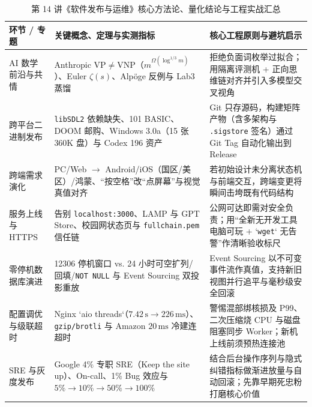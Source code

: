 \documentclass[a4paper]{article}
\begin{document}
\begin{table}[H]
\centering
\caption{第 14 讲《软件发布与运维》核心方法论、量化结论与工程实战汇总}
\label{tab:lecture14_summary}
\begin{tabular}{p{3.1cm}p{5.6cm}p{5.6cm}}
\toprule
\textbf{环节 / 专题} & \textbf{关键概念、定理与实测指标} & \textbf{核心工程原则与避坑启示} \\
\midrule
AI 数学前沿与共情 & Anthropic $\mathrm{VP} \neq \mathrm{VNP}$（$m^{\Omega(\log^{1/3} m)}$）、Euler $\zeta(s)$、Alpöge 反例与 Lab3 蒸馏 & 拒绝负面词枚举过拟合；用隔离评测机 + 正向思维链对齐并引入多模型交叉视角 \\
跨平台二进制发布 & \texttt{libSDL2} 依赖缺失、101 BASIC、DOOM 邮购、Windows 3.0a（15 张 360K 盘）与 Codex 196 资产 & Git 只存源码，构建矩阵产物（含多架构与 \texttt{.sigstore} 签名）通过 Git Tag 自动化输出到 Release \\
跨端需求演化 & PC/Web $\to$ Android/iOS（国区/美区）/鸿蒙、“按空格”改“点屏幕”与视觉真值对齐 & 若初始设计未分离状态机与前端交互，跨端变更将瞬间击垮既有代码结构 \\
服务上线与 HTTPS & 告别 \texttt{localhost:3000}、LAMP 与 GPT Store、校园网状态页与 \texttt{fullchain.pem} 信任链 & 公网可达即需对安全负责；用“全新无开发工具电脑可玩 + `\texttt{wget}` 无告警”作清晰验收标尺 \\
零停机数据库演进 & 12306 停机窗口 vs. 24 小时可空扩列/回填/\texttt{NOT NULL} 与 Event Sourcing 双投影重放 & Event Sourcing 以不可变事件流作真值，支持新旧视图并行追平与毫秒级安全回滚 \\
配置调优与级联超时 & Nginx `aio threads`（$7.42\,\mathrm{s} \to 226\,\mathrm{ms}$）、\texttt{gzip/brotli} 与 Amazon $20\,\mathrm{ms}$ 冷建连超时 & 警惕混部绑核损及 P99、二次压缩烧 CPU 与磁盘阻塞同步 Worker；新机上线前须预热连接池 \\
SRE 与灰度发布 & Google 4\% 专职 SRE（Keep the site up）、On-call、1\% Bug 效应与 $5\% \to 10\% \to 50\% \to 100\%$ & 结合后台操作序列与隐式纠错指标做渐进放量与自动回滚；先靠早期死忠粉打磨核心价值 \\
\bottomrule
\end{tabular}
\end{table}
\end{document}
